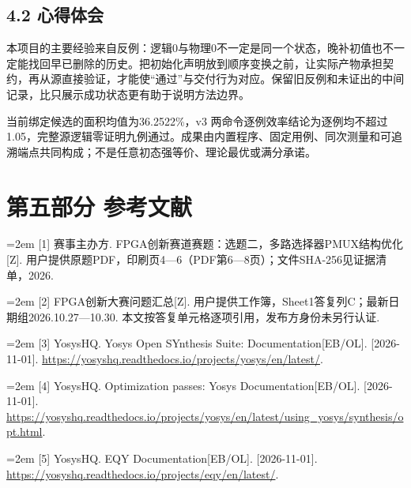 \documentclass[UTF8,fontset=fandol,12pt]{ctexart}
\begin{document}
\Needspace{129.6pt}\subsection*{4.2  心得体会}
本项目的主要经验来自反例：逻辑0与物理0不一定是同一个状态，晚补初值也不一定能找回早已删除的历史。把初始化声明放到顺序变换之前，让实际产物承担契约，再从源直接验证，才能使“通过”与交付行为对应。保留旧反例和未证出的中间记录，比只展示成功状态更有助于说明方法边界。

当前绑定候选的面积均值为36.2522\%，v3 两命令逐例效率结论为逐例均不超过1.05，完整源逻辑零证明九例通过。成果由内置程序、固定用例、同次测量和可追溯端点共同构成；不是任意初态强等价、理论最优或满分承诺。

\clearpage
\Needspace{129.6pt}\section*{第五部分  参考文献}
\begin{samepage}
{\fontsize{10.5}{15.75}\selectfont
\noindent\hangindent=2em [1] 赛事主办方. FPGA创新赛道赛题：选题二，多路选择器PMUX结构优化[Z]. 用户提供原题PDF，印刷页4—6（PDF第6—8页）；文件SHA-256见证据清单，2026.
\par
}
\end{samepage}
\begin{samepage}
{\fontsize{10.5}{15.75}\selectfont
\noindent\hangindent=2em [2] FPGA创新大赛问题汇总[Z]. 用户提供工作簿，Sheet1答复列C；最新日期组2026.10.27—10.30. 本文按答复单元格逐项引用，发布方身份未另行认证.
\par
}
\end{samepage}
\begin{samepage}
{\fontsize{10.5}{15.75}\selectfont
\noindent\hangindent=2em [3] YosysHQ. Yosys Open SYnthesis Suite: Documentation[EB/\allowbreak{}OL]. [2026-11-01]. \url{https://yosyshq.readthedocs.io/projects/yosys/en/latest/}.
\par
}
\end{samepage}
\begin{samepage}
{\fontsize{10.5}{15.75}\selectfont
\noindent\hangindent=2em [4] YosysHQ. Optimization passes: Yosys Documentation[EB/\allowbreak{}OL]. [2026-11-01]. \url{https://yosyshq.readthedocs.io/projects/yosys/en/latest/using_yosys/synthesis/opt.html}.
\par
}
\end{samepage}
\begin{samepage}
{\fontsize{10.5}{15.75}\selectfont
\noindent\hangindent=2em [5] YosysHQ. EQY Documentation[EB/\allowbreak{}OL]. [2026-11-01]. \url{https://yosyshq.readthedocs.io/projects/eqy/en/latest/}.
\par
}
\end{samepage}
\end{document}
